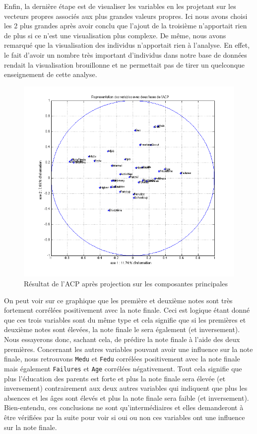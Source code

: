 \documentclass[11pt]{article}
\begin{document}
Enfin, la dernière étape est de visualiser les variables en les projetant sur les vecteurs propres associés aux plus grandes valeurs propres. Ici nous avons choisi les 2 plus grandes après avoir conclu que l'ajout de la troisième n'apportait rien de plus si ce n'est une visualisation plus complexe.
De même, nous avons remarqué que la visualisation des individus n'apportait rien à l'analyse. En effet, le fait d'avoir un nombre très important d'individus dans notre base de données rendait la visualisation brouillonne et ne permettait pas de tirer un quelconque enseignement de cette analyse.

\begin{figure}[h]
\centering
\includegraphics[scale=0.7]{Images/fig5.png}
\caption{Résultat de l'ACP après projection sur les composantes principales}
\end{figure}

On peut voir sur ce graphique que les première et deuxième notes sont très fortement corrélées positivement avec la note finale. Ceci est logique étant donné que ces trois variables sont du même type et cela signifie que si les premières et deuxième notes sont élevées, la note finale le sera également (et inversement). Nous essayerons donc, sachant cela, de prédire la note finale à l'aide des deux premières. Concernant les autres variables pouvant avoir une influence sur la note finale, nous retrouvons \texttt{Medu} et \texttt{Fedu} corrélées positivement avec la note finale mais également \texttt{Failures} et \texttt{Age} corrélées négativement. Tout cela signifie que plus l'éducation des parents est forte et plus la note finale sera élevée (et inversement) contrairement aux deux autres variables qui indiquent que plus les absences et les âges sont élevés et plus la note finale sera faible (et inversement). Bien-entendu, ces conclusions ne sont qu'intermédiaires et elles demanderont à être vérifiées par la suite pour voir si oui ou non ces variables ont une influence sur la note finale.
\end{document}

